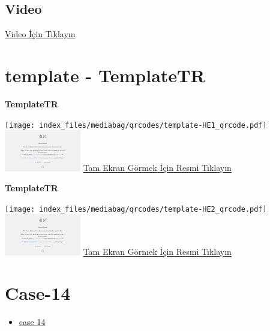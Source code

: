 \documentclass[
  letterpaper,
  DIV=11,
  numbers=noendperiod]{scrreprt}
\providecommand{\tightlist}{%
  \setlength{\itemsep}{0pt}\setlength{\parskip}{0pt}}\usepackage{longtable,booktabs,array}
\begin{document}
\hypertarget{video-12}{%
\subsection{Video}\label{video-12}}

\href{https://www.youtube.com/watch?v=TLRJ0pBrwxA}{Video İçin Tıklayın}

\hypertarget{sec-template}{%
\section{template - TemplateTR}\label{sec-template}}

\textbf{TemplateTR}

\texttt{[image: index\_files/mediabag/qrcodes/template-HE1\_qrcode.pdf]}
\href{https://images.patolojiatlasi.com/template/HE1.html}{\includegraphics[width=0.25\textwidth,height=\textheight]{./screenshots/thumbnail_template-HE1.png}}
\href{https://images.patolojiatlasi.com/template/HE1.html}{Tam Ekran
Görmek İçin Resmi Tıklayın}

\textbf{TemplateTR}

\texttt{[image: index\_files/mediabag/qrcodes/template-HE2\_qrcode.pdf]}
\href{https://images.patolojiatlasi.com/template/HE2.html}{\includegraphics[width=0.25\textwidth,height=\textheight]{./screenshots/thumbnail_template-HE2.png}}
\href{https://images.patolojiatlasi.com/template/HE2.html}{Tam Ekran
Görmek İçin Resmi Tıklayın}

\hypertarget{sec-hacettepe-case-of-the-month-case-14}{%
\section{Case-14}\label{sec-hacettepe-case-of-the-month-case-14}}

\begin{itemize}
\tightlist
\item
  \href{https://www.youtube.com/watch?v=MVZntjhry6g&ab_channel=KemalKosemehmetoglu}{case
  14}
\end{itemize}
\end{document}
